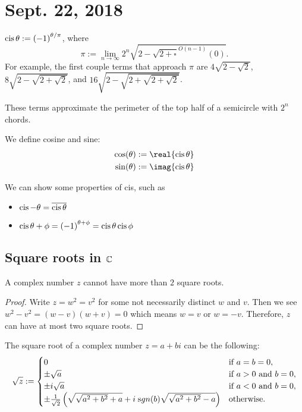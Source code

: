 \documentclass[notes]{subfile}
\begin{document}
\section{Sept. 22, 2018}

\begin{definition}
    $\operatorname{cis}{\theta} := {(-1)}^{\theta / \pi}$, where
    \[ \pi := \lim_{n \to \infty} 2^n \sqrt{2 - \sqrt{2 + \square}^{O(n-1)} (0)}. \]
    For example, the first couple terms that approach $\pi$ are $4\sqrt{2 - \sqrt{2}}$, $8\sqrt{2 - \sqrt{2 + \sqrt{2}}}$, and $16\sqrt{2 - \sqrt{2 + \sqrt{2 + \sqrt{2}}}}$.

    These terms approximate the perimeter of the top half of a semicircle with $2^n$ chords.
\end{definition}

\begin{definition}
    We define cosine and sine:
    \begin{align*}
        \cos(\theta) := \real{\cis{\theta}} \\
        \sin(\theta) := \imag{\cis{\theta}}
    \end{align*}
\end{definition}

We can show some properties of cis, such as
\begin{itemize}
    \item$ \operatorname{cis}{-\theta} = \overline{\operatorname{cis}{\theta}}$
    \item $\operatorname{cis}{\theta + \phi} = {(-1)}^{\theta + \phi} = \operatorname{cis}{\theta}\operatorname{cis}{\phi}$
\end{itemize}

\subsection{Square roots in $\operatorname{\mathbb{C}}$}
\begin{theorem}
    A complex number $z$ cannot have more than $2$ square roots.
\end{theorem}
\begin{proof}
    Write $z = w^2 = v^2$ for some not necessarily distinct $w$ and $v$.
    Then we see $w^2 - v^2 = (w-v)(w+v) = 0$ which means $w = v$ or $w = -v$.
    Therefore, $z$ can have at most two square roots.
\end{proof}

\begin{theorem}
    The square root of a complex number $z = a + bi$ can be the following:
    \[ \sqrt{z} := \begin{cases}
    0 & \text{if $a=b=0$}, \\
    \pm \sqrt{a} & \text{if $a>0$ and $b=0$}, \\
    \pm i\sqrt{a} & \text{if $a<0$ and $b=0$}, \\
    \pm \frac{1}{\sqrt{2}}\left(\sqrt{\sqrt{a^2 + b^2} + a} 
    + i\;{\text sgn}(b) \sqrt{\sqrt{a^2+b^2}-a} \right) & \text{otherwise}.
    \end{cases} \]
\end{theorem}
\end{document}
